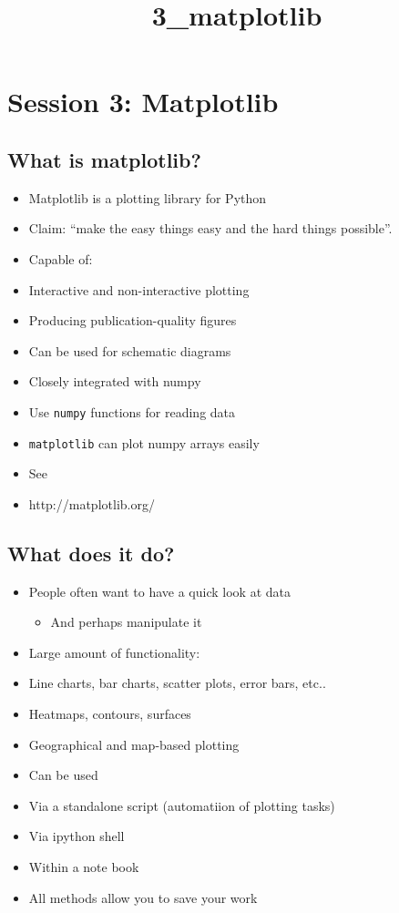 \documentclass[11pt]{article}
\title{3\_matplotlib}
\providecommand{\tightlist}{%
      \setlength{\itemsep}{0pt}\setlength{\parskip}{0pt}}
\begin{document}
    
    
    \maketitle
    
    

    
    \section{Session 3: Matplotlib}\label{session-3-matplotlib}

    \subsection{What is matplotlib?}\label{what-is-matplotlib}

\begin{itemize}
\item
  Matplotlib is a plotting library for Python
\item
  Claim: ``make the easy things easy and the hard things possible''.
\item
  Capable of:
\item
  Interactive and non-interactive plotting
\item
  Producing publication-quality figures
\item
  Can be used for schematic diagrams
\item
  Closely integrated with numpy
\item
  Use \texttt{numpy} functions for reading data
\item
  \texttt{matplotlib} can plot numpy arrays easily
\item
  See
\item
  http://matplotlib.org/
\end{itemize}

    \subsection{What does it do?}\label{what-does-it-do}

\begin{itemize}
\item
  People often want to have a quick look at data

  \begin{itemize}
  \tightlist
  \item
    And perhaps manipulate it
  \end{itemize}
\item
  Large amount of functionality:
\item
  Line charts, bar charts, scatter plots, error bars, etc..
\item
  Heatmaps, contours, surfaces
\item
  Geographical and map-based plotting
\item
  Can be used
\item
  Via a standalone script (automatiion of plotting tasks)
\item
  Via ipython shell
\item
  Within a note book
\item
  All methods allow you to save your work
\end{itemize}
\end{document}
